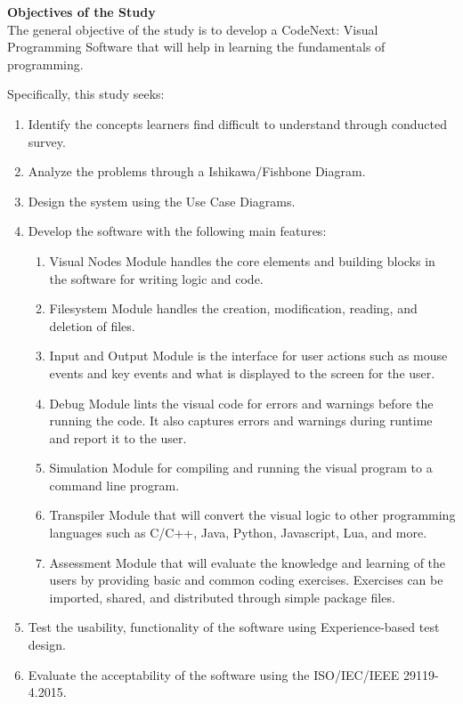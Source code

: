 \flushleft
\textbf{Objectives of the Study}\\
\justifying
\parx
The general objective of the study is to develop a CodeNext: Visual Programming
Software that will help in learning the fundamentals of programming.

\parx
Specifically, this study seeks:

\begin{enumerate}
	\item Identify the concepts learners find difficult to understand through conducted survey.
	\item Analyze the problems through a Ishikawa/Fishbone Diagram.
	\item Design the system using the Use Case Diagrams.
	\item Develop the software with the following main features:

		\begin{enumerate}
			\item Visual Nodes Module handles the core elements and building blocks
				in the software for writing logic and code.
			\item Filesystem Module handles the creation, modification, reading, and
				deletion of files.
			\item Input and Output Module is the interface for user actions such as mouse
				events and key events and what is displayed to the screen for the user.
			\item Debug Module lints the visual code for errors and warnings before
				the running the code. It also captures errors and warnings during runtime
				and report it to the user.
			\item Simulation Module for compiling and running the visual program to
				a command line program.
			\item Transpiler Module that will convert the visual logic to other
				programming languages such as C/C++, Java, Python, Javascript, Lua, and
				more.
			\item Assessment Module that will evaluate the knowledge and learning of the
				users by providing basic and common coding exercises. Exercises can be
				imported, shared, and distributed through simple package files.
		\end{enumerate}

	\item Test the usability, functionality of the software using Experience-based test design.

	\item Evaluate the acceptability of the software using the ISO/IEC/IEEE 29119-4.2015. \\
\end{enumerate}
